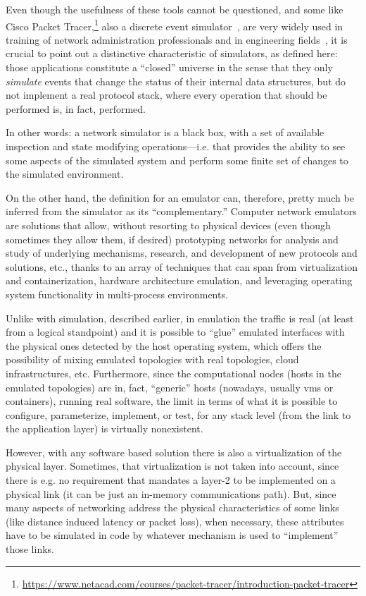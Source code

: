 Even though the usefulness of these tools cannot be questioned, and some like Cisco Packet Tracer,\footnote{\url{https://www.netacad.com/courses/packet-tracer/introduction-packet-tracer}} also a discrete event simulator~\cite{evaluatingnetsimmethodologicapproach}, are very widely used in training of network administration professionals and in engineering fields~\cite{rolepackettracer}, it is crucial to point out a distinctive characteristic of simulators, as defined here: those applications constitute a ``closed'' universe in the sense that they only \emph{simulate} events that change the status of their internal data structures, but do not implement a real protocol stack, where every operation that should be performed is, in fact, performed.

In other words: a network simulator is a black box, with a set of available inspection and state modifying operations---i.e. that provides the ability to see some aspects of the simulated system and perform some finite set of changes to the simulated environment.

On the other hand, the definition for an emulator can, therefore, pretty much be inferred from the simulator as its ``complementary.''
Computer network emulators are solutions that allow, without resorting to physical devices (even though sometimes they allow them, if desired) prototyping networks for analysis and study of underlying mechanisms, research, and development of new protocols and solutions, etc., thanks to an array of techniques that can span from virtualization and containerization, hardware architecture emulation, and leveraging operating system functionality in multi-process environments.

Unlike with simulation, described earlier, in emulation the traffic is real (at least from a logical standpoint) and it is possible to ``glue'' emulated interfaces with the physical ones detected by the host operating system, which offers the possibility of mixing emulated topologies with real topologies, cloud infrastructures, etc.
Furthermore, since the computational nodes (hosts in the emulated topologies) are in, fact, ``generic'' hosts (nowadays, usually \glspl{vm} or containers), running real software, the limit in terms of what it is possible to configure, parameterize, implement, or test, for any stack level (from the link to the application layer) is virtually nonexistent.

However, with any software based solution there is also a virtualization of the physical layer.
Sometimes, that virtualization is not taken into account, since there is e.g. no requirement that mandates a layer-2 to be implemented on a physical link (it can be just an in-memory communications path).
But, since many aspects of networking address the physical characteristics of some links (like distance induced latency or packet loss), when necessary, these attributes have to be simulated in code by whatever mechanism is used to ``implement'' those links.

